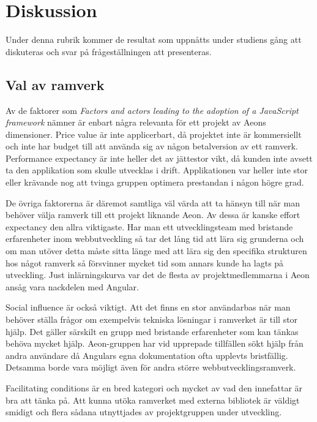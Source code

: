 \section{Diskussion}

Under denna rubrik kommer de resultat som uppnåtts under studiens gång att diskuteras och svar på frågeställningen att presenteras.

\subsection{Val av ramverk}

Av de faktorer som \textit{Factors and actors leading to the adoption of a JavaScript framework} nämner är enbart några relevanta för ett projekt av Aeons dimensioner. Price value är inte applicerbart, då projektet inte är kommersiellt och inte har budget till att använda sig av någon betalversion av ett ramverk. Performance expectancy är inte heller det av jättestor vikt, då kunden inte avsett ta den applikation som skulle utvecklas i drift. Applikationen var heller inte stor eller krävande nog att tvinga gruppen optimera prestandan i någon högre grad.

De övriga faktorerna är däremot samtliga väl värda att ta hänsyn till när man behöver välja ramverk till ett projekt liknande Aeon. Av dessa är kanske effort expectancy den allra viktigaste. Har man ett utvecklingsteam med bristande erfarenheter inom webbutveckling så tar det lång tid att lära sig grunderna och om man utöver detta måste sitta länge med att lära sig den specifika strukturen hos något ramverk så försvinner mycket tid som annars kunde ha lagts på utveckling. Just inlärningskurva var det de flesta av projektmedlemmarna i Aeon ansåg vara nackdelen med Angular.

Social influence är också viktigt. Att det finns en stor användarbas när man behöver ställa frågor om exempelvis tekniska lösningar i ramverket är till stor hjälp. Det gäller särskilt en grupp med bristande erfarenheter som kan tänkas behöva mycket hjälp. Aeon-gruppen har vid upprepade tillfällen sökt hjälp från andra användare då Angulars egna dokumentation ofta upplevts bristfällig. Detsamma borde vara möjligt även för andra större webbutvecklingsramverk.

Facilitating conditions är en bred kategori och mycket av vad den innefattar är bra att tänka på. Att kunna utöka ramverket med externa bibliotek är väldigt smidigt och flera sådana utnyttjades av projektgruppen under utveckling. 




